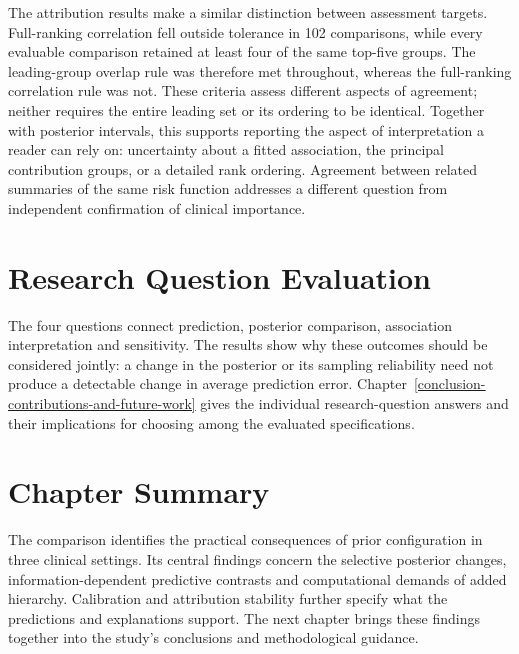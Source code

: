 The attribution results make a similar distinction between assessment targets. Full-ranking correlation fell outside tolerance in 102 comparisons, while every evaluable comparison retained at least four of the same top-five groups. The leading-group overlap rule was therefore met throughout, whereas the full-ranking correlation rule was not. These criteria assess different aspects of agreement; neither requires the entire leading set or its ordering to be identical. Together with posterior intervals, this supports reporting the aspect of interpretation a reader can rely on: uncertainty about a fitted association, the principal contribution groups, or a detailed rank ordering. Agreement between related summaries of the same risk function addresses a different question from independent confirmation of clinical importance.

\section{Research Question Evaluation}\label{research-question-evaluation}

The four questions connect prediction, posterior comparison, association interpretation and sensitivity. The results show why these outcomes should be considered jointly: a change in the posterior or its sampling reliability need not produce a detectable change in average prediction error. Chapter~\ref{conclusion-contributions-and-future-work} gives the individual research-question answers and their implications for choosing among the evaluated specifications.

\section{Chapter Summary}\label{chapter-summary}

The comparison identifies the practical consequences of prior configuration in three clinical settings. Its central findings concern the selective posterior changes, information-dependent predictive contrasts and computational demands of added hierarchy. Calibration and attribution stability further specify what the predictions and explanations support. The next chapter brings these findings together into the study's conclusions and methodological guidance.
